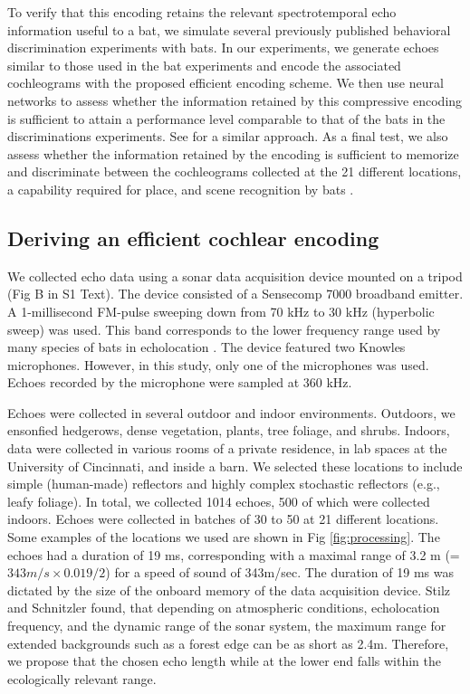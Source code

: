 \documentclass[10pt,letterpaper]{article}
\begin{document}
To verify that this encoding retains the relevant spectrotemporal echo information useful to a bat, we simulate several previously published behavioral discrimination experiments with bats. In our experiments, we generate echoes similar to those used in the bat experiments and encode the associated cochleograms with the proposed efficient encoding scheme. We then use neural networks to assess whether the information retained by this compressive encoding is sufficient to attain a performance level comparable to that of the bats in the discriminations experiments. See \cite{Wotton1997} for a similar approach. As a final test, we also assess whether the information retained by the encoding is sufficient to memorize and discriminate between the cochleograms collected at the 21 different locations, a capability required for place, and scene recognition by bats \cite{Vanderelst2016}. 

\subsection*{Deriving an efficient cochlear encoding}

We collected echo data using a sonar data acquisition device mounted on a tripod (Fig B in S1 Text). The device consisted of a Sensecomp 7000 broadband emitter. A 1-millisecond FM-pulse sweeping down from 70 kHz to 30 kHz (hyperbolic sweep) was used. This band corresponds to the lower frequency range used by many species of bats in echolocation \cite{Schnitzler2003}. The device featured two Knowles microphones. However, in this study, only one of the microphones was used. Echoes recorded by the microphone were sampled at 360 kHz. 

Echoes were collected in several outdoor and indoor environments. Outdoors, we ensonfied hedgerows, dense vegetation, plants, tree foliage, and shrubs. Indoors, data were collected in various rooms of a private residence, in lab spaces at the University of Cincinnati, and inside a barn. We selected these locations to include simple (human-made) reflectors and highly complex stochastic reflectors (e.g., leafy foliage). In total, we collected 1014 echoes, 500 of which were collected indoors. Echoes were collected in batches of 30 to 50 at 21 different locations. Some examples of the locations we used are shown in Fig \ref{fig:processing}. The echoes had a duration of 19 ms, corresponding with a maximal range of 3.2 m (=$343 m/s \times 0.019/2$) for a speed of sound of 343m/sec. The duration of 19 ms was dictated by the size of the onboard memory of the data acquisition device. Stilz and Schnitzler \cite{Stilz2012} found, that depending on atmospheric conditions, echolocation frequency, and the dynamic range of the sonar system, the maximum range for extended backgrounds such as a forest edge can be as short as 2.4m. Therefore, we propose that the chosen echo length while at the lower end falls within the ecologically relevant range.
\end{document}
